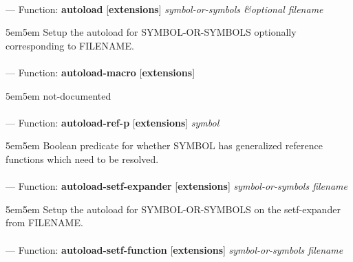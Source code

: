 \paragraph{}
\label{EXTENSIONS:AUTOLOAD}
--- Function: \textbf{autoload} [\textbf{extensions}] \textit{symbol-or-symbols \&optional filename}

\begin{adjustwidth}{5em}{5em}
Setup the autoload for SYMBOL-OR-SYMBOLS optionally corresponding to FILENAME.
\end{adjustwidth}

\paragraph{}
\label{EXTENSIONS:AUTOLOAD-MACRO}
--- Function: \textbf{autoload-macro} [\textbf{extensions}] \textit{}

\begin{adjustwidth}{5em}{5em}
not-documented
\end{adjustwidth}

\paragraph{}
\label{EXTENSIONS:AUTOLOAD-REF-P}
--- Function: \textbf{autoload-ref-p} [\textbf{extensions}] \textit{symbol}

\begin{adjustwidth}{5em}{5em}
Boolean predicate for whether SYMBOL has generalized reference functions which need to be resolved.
\end{adjustwidth}

\paragraph{}
\label{EXTENSIONS:AUTOLOAD-SETF-EXPANDER}
--- Function: \textbf{autoload-setf-expander} [\textbf{extensions}] \textit{symbol-or-symbols filename}

\begin{adjustwidth}{5em}{5em}
Setup the autoload for SYMBOL-OR-SYMBOLS on the setf-expander from FILENAME.
\end{adjustwidth}

\paragraph{}
\label{EXTENSIONS:AUTOLOAD-SETF-FUNCTION}
--- Function: \textbf{autoload-setf-function} [\textbf{extensions}] \textit{symbol-or-symbols filename}

